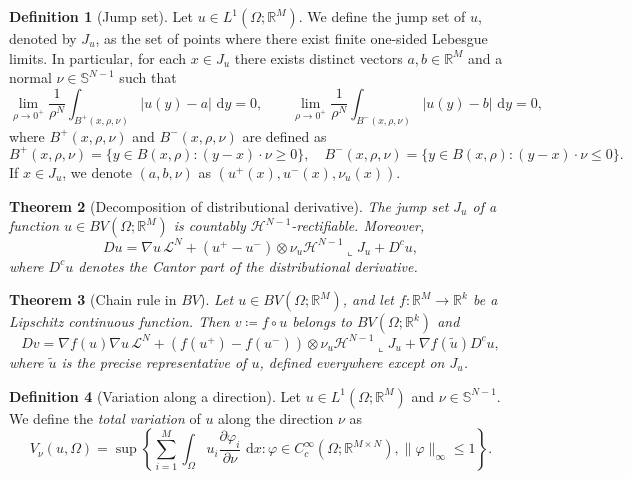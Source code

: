 \documentclass[a4paper, 11pt, reqno]{amsart}
\theoremstyle{plain}
\newtheorem{theorem}{Theorem}[section]
\theoremstyle{definition}
\newtheorem{definition}[theorem]{Definition}
\theoremstyle{remark}
\newcommand{\R}{\mathbb R}
\newcommand{\dd}{\,\mathrm{d}}
\begin{document}
\begin{definition}[Jump set]
    Let $u \in L^1 (\Omega; \R^M)$. We define the jump set of $u$, denoted by $J_u$, as the set of points where there exist finite one-sided Lebesgue limits. In particular, for each $x \in J_u$ there exists distinct vectors $a,b \in \R^M$ and a normal $\nu \in \mathbb{S}^{N-1}$ such that
    \begin{equation}
        \lim_{\rho \to 0^+} \frac{1}{\rho^N} \int_{B^+ (x, \rho, \nu)} | u(y) - a | \, \dd y = 0, \qquad \lim_{\rho \to 0^+} \frac{1}{\rho^N} \int_{B^- (x, \rho, \nu)} | u(y) - b | \, \dd y = 0,
    \end{equation}
    where $B^+ (x, \rho, \nu)$ and $B^- (x, \rho, \nu)$ are defined as
    \begin{equation*}
        B^+ (x, \rho, \nu) = \{ y \in B(x,\rho) : (y - x) \cdot \nu \geq 0 \}, \quad B^- (x, \rho, \nu) = \{ y \in B(x,\rho) : (y - x) \cdot \nu \leq 0 \}.
    \end{equation*}
    If $x \in J_u$, we denote $(a,b,\nu)$ as $(u^+ (x), u^- (x), \nu_u (x))$.
\end{definition}

\begin{theorem}[Decomposition of distributional derivative]
    The jump set $J_u$ of a function $u \in BV(\Omega; \R^M)$ is countably $\mathcal{H}^{N-1}$-rectifiable. Moreover, 
    \begin{equation}
        Du = \nabla u\, \mathcal{L}^N + ( u^+ - u^- ) \otimes\nu_u \mathcal{H}^{N-1} \llcorner J_u + D^c u,
    \end{equation}
    where $D^c u$ denotes the Cantor part of the distributional derivative.
\end{theorem}

\begin{theorem}[Chain rule in $BV$]
    Let $u \in BV(\Omega; \R^M)$, and let $f : \R^M \to \R^k$ be a Lipschitz continuous function. Then $v \coloneqq f \circ u$ belongs to $BV(\Omega; \R^k)$ and 
    \begin{equation*}
        D v = \nabla f(u) \nabla u\, \mathcal{L}^N + (f(u^+) - f(u^-)) \otimes \nu_u \mathcal{H}^{N-1} \llcorner J_u + \nabla f (\widetilde{u}) D^c u,
    \end{equation*}
    where $\widetilde{u}$ is the precise representative of $u$, defined everywhere except on $J_u$.
\end{theorem}

\begin{definition}[Variation along a direction]
    Let $u \in L^1 (\Omega; \R^M)$ and $\nu \in \mathbb{S}^{N-1}$. We define the \emph{total variation} of $u$ along the direction $\nu$ as 
    \begin{equation*}
        V_\nu (u, \Omega) = \sup \left\{ \sum_{i=1}^M \int_\Omega u_i \frac{\partial \varphi_i}{\partial \nu} \, \dd x : \varphi \in C_c^\infty (\Omega; \R^{M \times N}), \| \varphi \|_\infty \leq 1 \right\}.
    \end{equation*}
\end{definition}
\end{document}

